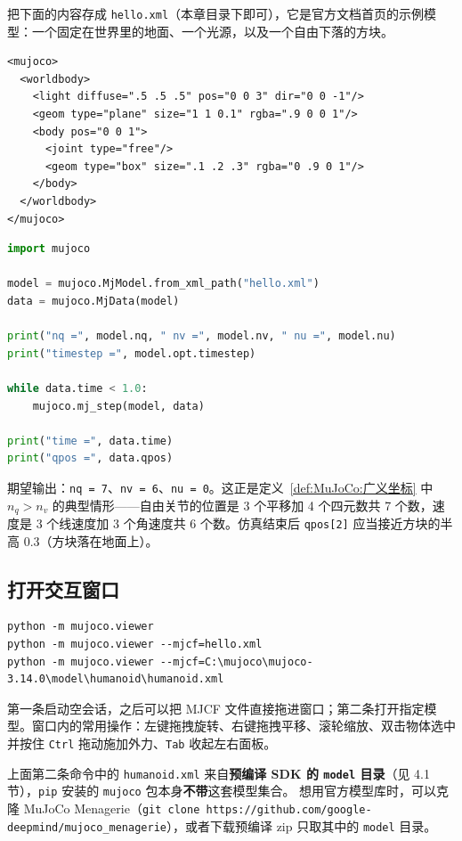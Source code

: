 把下面的内容存成 \texttt{hello.xml}（本章目录下即可），它是官方文档首页的示例模型：一个固定在世界里的地面、一个光源，以及一个自由下落的方块。

\begin{lstlisting}[style=xml]
<mujoco>
  <worldbody>
    <light diffuse=".5 .5 .5" pos="0 0 3" dir="0 0 -1"/>
    <geom type="plane" size="1 1 0.1" rgba=".9 0 0 1"/>
    <body pos="0 0 1">
      <joint type="free"/>
      <geom type="box" size=".1 .2 .3" rgba="0 .9 0 1"/>
    </body>
  </worldbody>
</mujoco>
\end{lstlisting}

\begin{lstlisting}[style=code, language=Python]
import mujoco

model = mujoco.MjModel.from_xml_path("hello.xml")
data = mujoco.MjData(model)

print("nq =", model.nq, " nv =", model.nv, " nu =", model.nu)
print("timestep =", model.opt.timestep)

while data.time < 1.0:
    mujoco.mj_step(model, data)

print("time =", data.time)
print("qpos =", data.qpos)
\end{lstlisting}

期望输出：\texttt{nq = 7}、\texttt{nv = 6}、\texttt{nu = 0}。这正是定义~\ref{def:MuJoCo:广义坐标} 中 $n_{q}>n_{v}$ 的典型情形——自由关节的位置是 3 个平移加 4 个四元数共 7 个数，速度是 3 个线速度加 3 个角速度共 6 个数。仿真结束后 \texttt{qpos[2]} 应当接近方块的半高 $0.3$（方块落在地面上）。

\subsection{打开交互窗口}

\begin{lstlisting}[style=shell]
python -m mujoco.viewer
python -m mujoco.viewer --mjcf=hello.xml
python -m mujoco.viewer --mjcf=C:\mujoco\mujoco-3.14.0\model\humanoid\humanoid.xml
\end{lstlisting}

第一条启动空会话，之后可以把 MJCF 文件直接拖进窗口；第二条打开指定模型。窗口内的常用操作：左键拖拽旋转、右键拖拽平移、滚轮缩放、双击物体选中并按住 \texttt{Ctrl} 拖动施加外力、\texttt{Tab} 收起左右面板。

\begin{note}
	上面第二条命令中的 \texttt{humanoid.xml} 来自\textbf{预编译 SDK 的 \texttt{model} 目录}（见 4.1 节），\texttt{pip} 安装的 \texttt{mujoco} 包本身\textbf{不带}这套模型集合。
	想用官方模型库时，可以克隆 MuJoCo Menagerie（\texttt{git clone https://github.com/google-deepmind/mujoco\_menagerie}），或者下载预编译 zip 只取其中的 \texttt{model} 目录。
\end{note}

